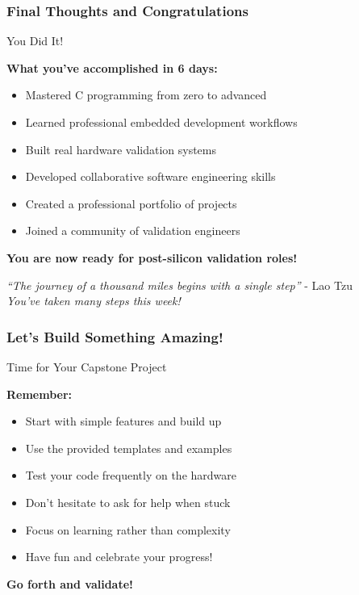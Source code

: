\documentclass{beamer}
\begin{document}
\begin{frame}
\frametitle{Final Thoughts and Congratulations}
\begin{center}
\Large You Did It!
\end{center}

\small \textbf{What you've accomplished in 6 days:}
\begin{itemize}
    \item \footnotesize Mastered C programming from zero to advanced
    \item \footnotesize Learned professional embedded development workflows
    \item \footnotesize Built real hardware validation systems
    \item \footnotesize Developed collaborative software engineering skills
    \item \footnotesize Created a professional portfolio of projects
    \item \footnotesize Joined a community of validation engineers
\end{itemize}

\vspace{0.3cm}
\begin{center}
\textbf{You are now ready for post-silicon validation roles!}
\end{center}

\vspace{0.3cm}
\begin{center}
\textit{``The journey of a thousand miles begins with a single step''} - Lao Tzu\\
\textit{You've taken many steps this week!}
\end{center}
\end{frame}

\begin{frame}
\frametitle{Let's Build Something Amazing!}
\begin{center}
\Large Time for Your Capstone Project
\end{center}

\textbf{Remember:}
\begin{itemize}
    \item Start with simple features and build up
    \item Use the provided templates and examples
    \item Test your code frequently on the hardware
    \item Don't hesitate to ask for help when stuck
    \item Focus on learning rather than complexity
    \item Have fun and celebrate your progress!
\end{itemize}

\vspace{1cm}
\begin{center}
\textbf{Go forth and validate!}
\end{center}
\end{frame}
\end{document}
